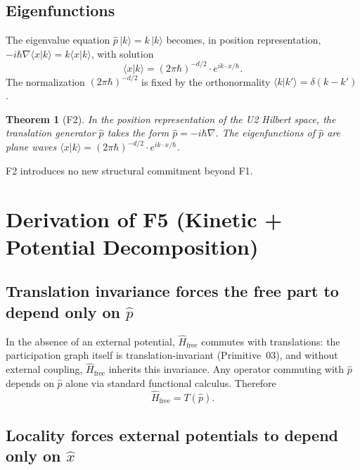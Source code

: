 \documentclass[11pt,a4paper]{article}
\newtheorem{theorem}{Theorem}[section]
\begin{document}
\subsection{Eigenfunctions}

The eigenvalue equation $\hat{p} \, |k\rangle = k \, |k\rangle$ becomes, in position representation, $-i \hbar \nabla \langle x | k \rangle = k \langle x | k \rangle$, with solution
\begin{equation}
\langle x | k \rangle = (2\pi\hbar)^{-d/2} \cdot e^{i k \cdot x / \hbar}. \label{eq:planewave}
\end{equation}
The normalization $(2\pi\hbar)^{-d/2}$ is fixed by the orthonormality $\langle k | k' \rangle = \delta(k - k')$.

\begin{theorem}[F2]
In the position representation of the U2 Hilbert space, the translation generator $\hat{p}$ takes the form $\hat{p} = -i \hbar \nabla$. The eigenfunctions of $\hat{p}$ are plane waves $\langle x | k \rangle = (2\pi\hbar)^{-d/2} \cdot e^{i k \cdot x / \hbar}$.
\end{theorem}

F2 introduces no new structural commitment beyond F1.

\section{Derivation of F5 (Kinetic + Potential Decomposition)}\label{sec:F5}

\subsection{Translation invariance forces the free part to depend only on $\hat{p}$}

In the absence of an external potential, $\hat{H}_\mathrm{free}$ commutes with translations: the participation graph itself is translation-invariant (Primitive~03), and without external coupling, $\hat{H}_\mathrm{free}$ inherits this invariance. Any operator commuting with $\hat{p}$ depends on $\hat{p}$ alone via standard functional calculus. Therefore
\begin{equation}
\hat{H}_\mathrm{free} = T(\hat{p}). \label{eq:Hfree}
\end{equation}

\subsection{Locality forces external potentials to depend only on $\hat{x}$}
\end{document}
